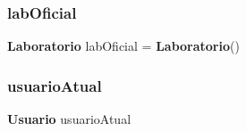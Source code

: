 \subsubsection{lab\+Oficial}
{\footnotesize\ttfamily \textbf{ Laboratorio} lab\+Oficial = \textbf{ Laboratorio}()}

\mbox{\label{main_8cpp_abc48cbf4b0386be5026734f0ce9cf0dd}} 
\subsubsection{usuario\+Atual}
{\footnotesize\ttfamily \textbf{ Usuario} usuario\+Atual}

